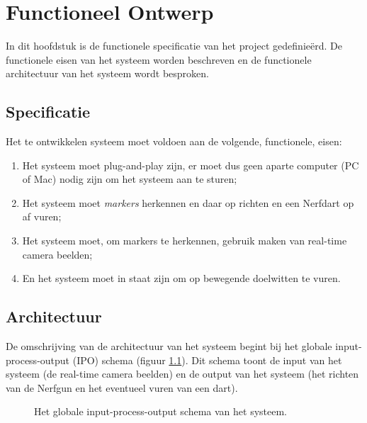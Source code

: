 \chapter{Functioneel Ontwerp}
\label{chap:functional}


In dit hoofdstuk is de functionele specificatie van het \autonerf project
gedefinieërd. De functionele eisen van het systeem worden beschreven en de
functionele architectuur van het systeem wordt besproken.

\section{Specificatie}

Het te ontwikkelen systeem moet voldoen aan de volgende, functionele, eisen:

\begin{enumerate}
    \item Het systeem moet plug-and-play zijn, er moet dus geen aparte computer
        (PC of Mac) nodig zijn om het systeem aan te sturen;
    \item Het systeem moet \emph{markers} herkennen en daar op richten en een
        Nerfdart op af vuren;
    \item Het systeem moet, om markers te herkennen, gebruik maken van real-time
        camera beelden;
    \item En het systeem moet in staat zijn om op bewegende doelwitten te vuren.
\end{enumerate}

\section{Architectuur}

De omschrijving van de architectuur van het \autonerf systeem begint bij het
globale input-process-output (IPO) schema (figuur \ref{fig:ipo-global}). Dit
schema toont de input van het systeem (de real-time camera beelden) en de output
van het systeem (het richten van de Nerfgun en het eventueel vuren van een dart).

\begin{figure}[H]
    \begin{center}
        
    \end{center}
    \caption{Het globale input-process-output schema van het \autonerf systeem.}
    \label{fig:ipo-global}
\end{figure}


